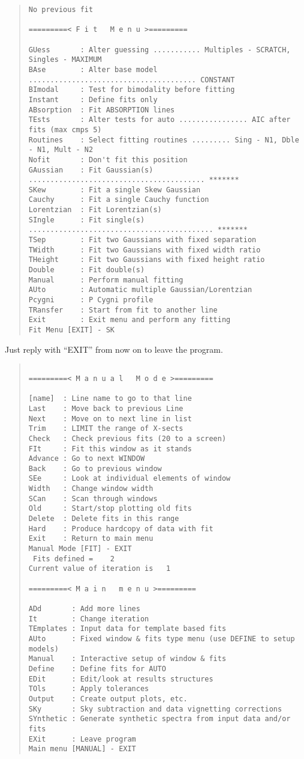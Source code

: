\begin{quote}\begin{verbatim}
No previous fit

=========< F i t   M e n u >=========

GUess       : Alter guessing ........... Multiples - SCRATCH, Singles - MAXIMUM
BAse        : Alter base model ....................................... CONSTANT
BImodal     : Test for bimodality before fitting
Instant     : Define fits only
ABsorption  : Fit ABSORPTION lines
TEsts       : Alter tests for auto ................ AIC after fits (max cmps 5)
Routines    : Select fitting routines ......... Sing - N1, Dble - N1, Mult - N2
Nofit       : Don't fit this position
GAussian    : Fit Gaussian(s) ......................................... *******
SKew        : Fit a single Skew Gaussian
Cauchy      : Fit a single Cauchy function
Lorentzian  : Fit Lorentzian(s)
SIngle      : Fit single(s) ........................................... *******
TSep        : Fit two Gaussians with fixed separation
TWidth      : Fit two Gaussians with fixed width ratio
THeight     : Fit two Gaussians with fixed height ratio
Double      : Fit double(s)
Manual      : Perform manual fitting
AUto        : Automatic multiple Gaussian/Lorentzian
Pcygni      : P Cygni profile
TRansfer    : Start from fit to another line
Exit        : Exit menu and perform any fitting
Fit Menu [EXIT] - SK
\end{verbatim}\end{quote}
Just reply with ``EXIT'' from now on to leave the program.
\begin{quote}\begin{verbatim}

=========< M a n u a l   M o d e >=========

[name]  : Line name to go to that line
Last    : Move back to previous Line
Next    : Move on to next line in list
Trim    : LIMIT the range of X-sects
Check   : Check previous fits (20 to a screen)
FIt     : Fit this window as it stands
Advance : Go to next WINDOW
Back    : Go to previous window
SEe     : Look at individual elements of window
Width   : Change window width
SCan    : Scan through windows
Old     : Start/stop plotting old fits
Delete  : Delete fits in this range
Hard    : Produce hardcopy of data with fit
Exit    : Return to main menu
Manual Mode [FIT] - EXIT
 Fits defined =    2
Current value of iteration is   1

=========< M a i n   m e n u >=========

ADd       : Add more lines
It        : Change iteration
TEmplates : Input data for template based fits
AUto      : Fixed window & fits type menu (use DEFINE to setup models)
Manual    : Interactive setup of window & fits
Define    : Define fits for AUTO
EDit      : Edit/look at results structures
TOls      : Apply tolerances
Output    : Create output plots, etc.
SKy       : Sky subtraction and data vignetting corrections
SYnthetic : Generate synthetic spectra from input data and/or fits
EXit      : Leave program
Main menu [MANUAL] - EXIT
\end{verbatim}\end{quote}

